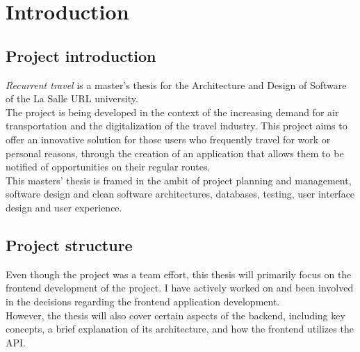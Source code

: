 \documentclass[../memory.tex]{subfiles}
\begin{document}
\chapter{Introduction}
\section{Project introduction}
\emph{Recurrent travel} is a master's thesis for the Architecture and Design of
Software of the La Salle URL university.
\\
The project is being developed in the context of the increasing demand for air
transportation and the digitalization of the travel industry. This project aims
to offer an innovative solution for those users who frequently travel for work
or personal reasons, through the creation of an application that allows them to
be notified of opportunities on their regular routes.
\\[8pt]
This masters' thesis is framed in the ambit of project planning and management,
software design and clean software architectures, databases, testing, user
interface design and user experience.
\section{Project structure}
Even though the project was a team effort, this thesis will primarily focus on
the frontend development of the project. I have actively worked on and been
involved in the decisions regarding the frontend application development.
\\[8pt]
However, the thesis will also cover certain aspects of the backend, including
key concepts, a brief explanation of its architecture, and how the frontend
utilizes the API.
\end{document}
